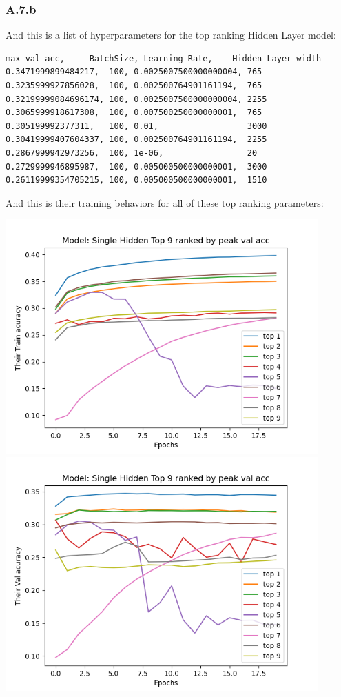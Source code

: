 \documentclass[]{article}
\begin{document}
    \subsubsection*{A.7.b}
        And this is a list of hyperparameters for the top ranking Hidden Layer model: 
        \begin{lstlisting}
max_val_acc,     BatchSize, Learning_Rate,    Hidden_Layer_width
0.3471999899484217,  100, 0.0025007500000000004, 765
0.3235999927856028,  100, 0.002500764901161194,  765
0.32199999084696174, 100, 0.0025007500000000004, 2255
0.3065999918617308,  100, 0.007500250000000001,  765
0.305199992377311,   100, 0.01,                  3000
0.30419999407604337, 100, 0.002500764901161194,  2255
0.2867999942973256,  100, 1e-06,                 20
0.2729999946895987,  100, 0.005000500000000001,  3000
0.26119999354705215, 100, 0.005000500000000001,  1510
        \end{lstlisting}
        And this is their training behaviors for all of these top ranking parameters: 
        \begin{center}
            \includegraphics[width=12cm]{a6plots/20-16-57-May-22-2021-Single Hidden-train-acc.png}
            \includegraphics[width=12cm]{a6plots/20-16-57-May-22-2021-Single Hidden-val-acc.png}
        \end{center}
\end{document}
